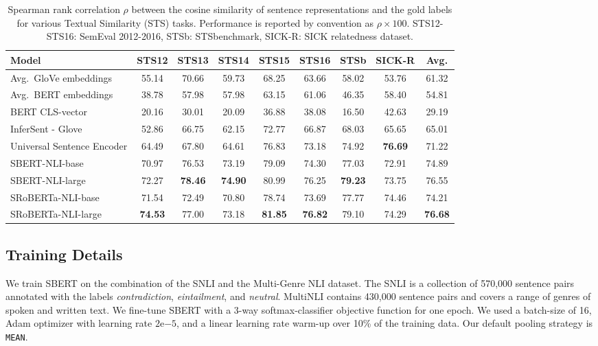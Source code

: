 \documentclass[11pt,a4paper]{article}
\begin{document}
\begin{table}[t]
	\centering 
	\footnotesize
	\begin{tabular}{|l|c|c|c|c|c|c|c||c|}
		\hline
		\textbf{Model} & \textbf{STS12} & \textbf{STS13} & \textbf{STS14} & \textbf{STS15} & \textbf{STS16} & \textbf{STSb} & \textbf{SICK-R} & \textbf{Avg.} \\ \hline
		Avg.\ GloVe embeddings & 55.14 & 70.66 & 59.73 & 68.25 & 63.66 & 58.02 & 53.76 & 61.32 \\
		Avg.\ BERT embeddings & 38.78 & 57.98 & 57.98 & 63.15 & 61.06 & 46.35 & 58.40 & 54.81 \\
		BERT CLS-vector & 20.16 & 30.01 & 20.09 & 36.88 & 38.08 & 16.50 & 42.63 & 29.19 \\
		InferSent - Glove & 52.86 & 66.75 & 62.15 & 72.77 & 66.87 & 68.03 & 65.65 &  65.01 \\
		Universal Sentence Encoder & 64.49 & 67.80 & 64.61 & 76.83 & 73.18 & 74.92 & \textbf{76.69} & 71.22 \\ \hline
		SBERT-NLI-base & 70.97 & 76.53 & 73.19 & 79.09 & 74.30 & 77.03 & 72.91 & 74.89 \\
		SBERT-NLI-large & {72.27} & \textbf{78.46} & \textbf{74.90} & {80.99} & {76.25} & \textbf{79.23} & 73.75 & {76.55} \\ \hline 
		SRoBERTa-NLI-base & 71.54 & 72.49 & 70.80 & 78.74 & 73.69 & 77.77 & 74.46 & 74.21  \\ 
		SRoBERTa-NLI-large & \textbf{74.53} & 77.00 & 73.18 & \textbf{81.85} & \textbf{76.82} & 79.10 & 74.29 & \textbf{76.68} \\ \hline
	\end{tabular}
	\caption{Spearman rank correlation $\rho$ between the cosine similarity of sentence representations and the gold labels for various Textual Similarity (STS) tasks. Performance is reported by convention as $\rho \times 100$. STS12-STS16: SemEval 2012-2016, STSb: STSbenchmark, SICK-R: SICK relatedness dataset.}
	\label{table_sts_tasks}
\end{table}


\subsection{Training Details}
We train SBERT on the combination of the SNLI \cite{snli} and the Multi-Genre NLI \cite{multinli} dataset. The SNLI is a collection of 570,000 sentence pairs annotated with the labels \textit{contradiction}, \textit{eintailment}, and \textit{neutral}. MultiNLI contains 430,000 sentence pairs and covers a range of genres of spoken and written text. We fine-tune SBERT with a 3-way softmax-classifier objective function for one epoch. We used a batch-size of 16, Adam optimizer with learning rate $2\mathrm{e}{-5}$, and a linear learning rate warm-up over 10\% of the training data. Our default pooling strategy is \texttt{MEAN}.
\end{document}
